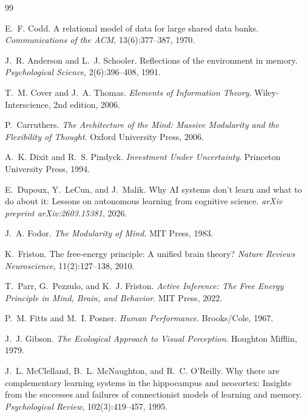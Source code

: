 \documentclass[11pt]{article}
\theoremstyle{definition}
\theoremstyle{remark}
\begin{document}

\begin{thebibliography}{99}

E.~F. Codd.
\newblock A relational model of data for large shared data banks.
\newblock \emph{Communications of the ACM}, 13(6):377--387, 1970.

J.~R. Anderson and L.~J. Schooler.
\newblock Reflections of the environment in memory.
\newblock \emph{Psychological Science}, 2(6):396--408, 1991.

T.~M. Cover and J.~A. Thomas.
\newblock \emph{Elements of Information Theory}.
\newblock Wiley-Interscience, 2nd edition, 2006.

P.~Carruthers.
\newblock \emph{The Architecture of the Mind: Massive Modularity and the
  Flexibility of Thought}.
\newblock Oxford University Press, 2006.

A.~K. Dixit and R.~S. Pindyck.
\newblock \emph{Investment Under Uncertainty}.
\newblock Princeton University Press, 1994.

E.~Dupoux, Y.~LeCun, and J.~Malik.
\newblock Why {AI} systems don't learn and what to do about it: Lessons on
  autonomous learning from cognitive science.
\newblock \emph{arXiv preprint arXiv:2603.15381}, 2026.

J.~A. Fodor.
\newblock \emph{The Modularity of Mind}.
\newblock MIT Press, 1983.

K.~Friston.
\newblock The free-energy principle: A unified brain theory?
\newblock \emph{Nature Reviews Neuroscience}, 11(2):127--138, 2010.

T.~Parr, G.~Pezzulo, and K.~J. Friston.
\newblock \emph{Active Inference: The Free Energy Principle in Mind, Brain, and
  Behavior}.
\newblock MIT Press, 2022.

P.~M. Fitts and M.~I. Posner.
\newblock \emph{Human Performance}.
\newblock Brooks/Cole, 1967.

J.~J. Gibson.
\newblock \emph{The Ecological Approach to Visual Perception}.
\newblock Houghton Mifflin, 1979.

J.~L. McClelland, B.~L. McNaughton, and R.~C. O'Reilly.
\newblock Why there are complementary learning systems in the hippocampus and
  neocortex: Insights from the successes and failures of connectionist models
  of learning and memory.
\newblock \emph{Psychological Review}, 102(3):419--457, 1995.


\end{thebibliography}
\end{document}
